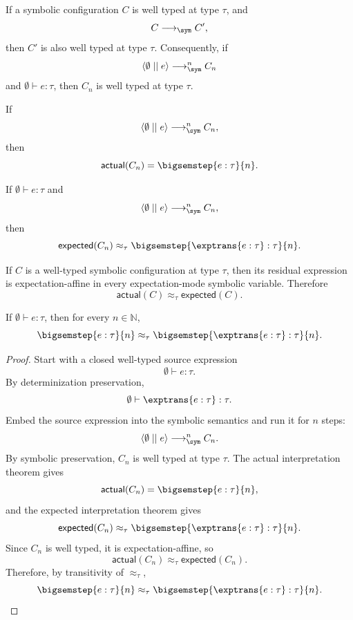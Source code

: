 \begin{lemma}
  If a symbolic configuration $C$ is well typed at type $\tau$, and
  \[
    C \longrightarrow_{\sym} C',
  \]
  then $C'$ is also well typed at type $\tau$.  Consequently, if
  \[
    \langle \emptyset \mid\mid e \rangle
    \longrightarrow_{\sym}^{n}
    C_n
  \]
  and $\emptyset \vdash e : \tau$, then $C_n$ is well typed at type
  $\tau$.
\end{lemma}

\begin{lemma}
  If
  \[
    \langle \emptyset \mid\mid e \rangle
    \longrightarrow_{\sym}^{n}
    C_n,
  \]
  then
  \[
    \mathsf{actual}(C_n) = \bigsemstep{e : \tau}{n}.
  \]
\end{lemma}

\begin{lemma}
  If $\emptyset \vdash e : \tau$ and
  \[
    \langle \emptyset \mid\mid e \rangle
    \longrightarrow_{\sym}^{n}
    C_n,
  \]
  then
  \[
    \mathsf{expected}(C_n)
    \approx_\tau
    \bigsemstep{\exptrans{e : \tau} : \tau}{n}.
  \]
\end{lemma}

\begin{lemma}
  If $C$ is a well-typed symbolic configuration at type $\tau$, then its
  residual expression is expectation-affine in every expectation-mode symbolic
  variable.  Therefore
  \[
    \mathsf{actual}(C) \approx_\tau \mathsf{expected}(C).
  \]
\end{lemma}

\begin{theorem}
  If $\emptyset \vdash e : \tau$, then for every $n \in \mathbb{N}$,
  \[
    \bigsemstep{e : \tau}{n}
    \approx_\tau
    \bigsemstep{\exptrans{e : \tau} : \tau}{n}.
  \]
\end{theorem}

\begin{proof}
  Start with a closed well-typed source expression
  \[
    \emptyset \vdash e : \tau.
  \]
  By determinization preservation,
  \[
    \emptyset \vdash \exptrans{e : \tau} : \tau.
  \]
  Embed the source expression into the symbolic semantics and run it for
  $n$ steps:
  \[
    \langle \emptyset \mid\mid e \rangle
    \longrightarrow_{\sym}^{n}
    C_n.
  \]
  By symbolic preservation, $C_n$ is well typed at type $\tau$.  The actual
  interpretation theorem gives
  \[
    \mathsf{actual}(C_n) = \bigsemstep{e : \tau}{n},
  \]
  and the expected interpretation theorem gives
  \[
    \mathsf{expected}(C_n)
    \approx_\tau
    \bigsemstep{\exptrans{e : \tau} : \tau}{n}.
  \]
  Since $C_n$ is well typed, it is expectation-affine, so
  \[
    \mathsf{actual}(C_n) \approx_\tau \mathsf{expected}(C_n).
  \]
  Therefore, by transitivity of $\approx_\tau$,
  \[
    \bigsemstep{e : \tau}{n}
    \approx_\tau
    \bigsemstep{\exptrans{e : \tau} : \tau}{n}.
  \]
\end{proof}


